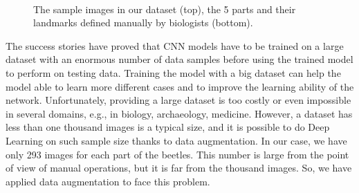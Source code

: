 \documentclass[review]{elsarticle}
\begin{document}
\begin{figure}[h!]
~~
~~
~\\
    \caption{The sample images in our dataset (top), the 5 parts and
      their landmarks defined manually by biologists (bottom).}
    \label{figdatasamples}
\end{figure}

The success stories \cite{krizhevsky2012imagenet, ciregan2012multi,  szegedy2015going} have proved that CNN models have to be trained on a large dataset with an enormous number of data samples before using the trained model to perform on testing data. Training the model with a big dataset can help the model able to learn more different cases and to improve the learning ability of the network. Unfortunately, providing a large dataset is too costly or even impossible in several domains, e.g., in biology, archaeology, medicine. However, a dataset has less than one thousand images is a typical size, and it is possible to do Deep Learning on such sample size thanks to data augmentation. In our case, we have only 293 images for each part of the beetles. This number is large from the point of view of manual operations, but it is far from the thousand images. So, we have applied data augmentation to face this problem.
\end{document}
